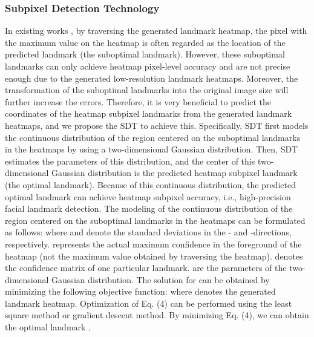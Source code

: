 \documentclass[journal]{IEEEtran}
\begin{document}
\subsubsection{Subpixel Detection Technology} \indent\indent In existing works \cite{Yang2017StackedHN, Dong2018StyleAN, Zhu2019RobustFL}, by traversing the generated landmark heatmap, the pixel with the maximum value on the heatmap is often regarded as the location of the predicted landmark (the suboptimal landmark). However, these suboptimal landmarks can only achieve heatmap pixel-level accuracy and are not precise enough due to the generated low-resolution landmark heatmaps. Moreover, the transformation of the suboptimal landmarks into the original image size will further increase the errors. Therefore, it is very beneficial to predict the coordinates of the heatmap subpixel landmarks from the generated landmark heatmaps, and we propose the SDT to achieve this. Specifically, SDT first models the continuous distribution of the region centered on the suboptimal landmarks in the heatmaps by using a two-dimensional Gaussian distribution. Then, SDT estimates the parameters of this distribution, and the center of this two-dimensional Gaussian distribution is the predicted heatmap subpixel landmark (the optimal landmark). Because of this continuous distribution, the predicted optimal landmark can achieve heatmap subpixel accuracy, i.e., high-precision facial landmark detection. The modeling of the continuous distribution of the region centered on the suboptimal landmarks in the heatmaps can be formulated as follows:
where  and  denote the standard deviations in the - and -directions, respectively.  represents the actual maximum confidence in the foreground of the heatmap (not the maximum value obtained by traversing the heatmap).  denotes the confidence matrix of one particular landmark.  are the parameters of the two-dimensional Gaussian distribution. The solution for  can be obtained by minimizing the following objective function:
where  denotes the generated landmark heatmap. Optimization of Eq. (4) can be performed using the least square method or gradient descent method. By minimizing Eq. (4), we can obtain the optimal landmark .
\end{document}
